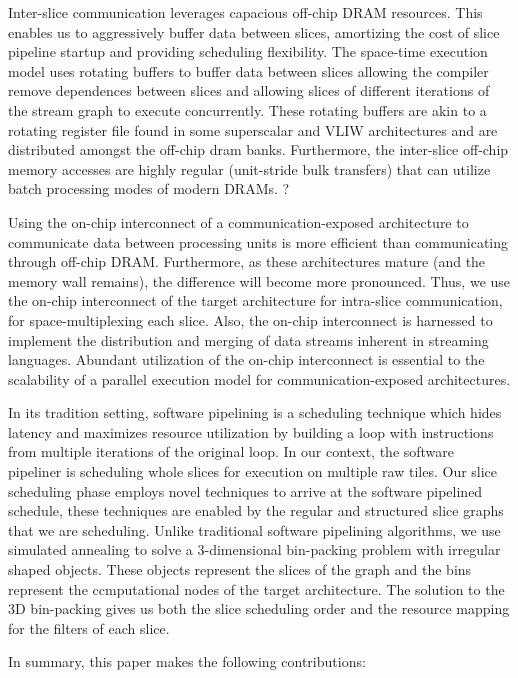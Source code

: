 Inter-slice communication leverages capacious off-chip DRAM resources.
This enables us to aggressively buffer data between slices, amortizing
the cost of slice pipeline startup and providing scheduling
flexibility. The space-time execution model uses rotating buffers to
buffer data between slices allowing the compiler remove dependences
between slices and allowing slices of different iterations of the
stream graph to execute concurrently.  These rotating buffers are akin
to a rotating register file found in some superscalar and VLIW
architectures and are distributed amongst the off-chip dram
banks. Furthermore, the inter-slice off-chip memory accesses are
highly regular (unit-stride bulk transfers) that can utilize batch
processing modes of modern DRAMs. ?

Using the on-chip interconnect of a communication-exposed architecture
to communicate data between processing units is more efficient than
communicating through off-chip DRAM. Furthermore, as these
architectures mature (and the memory wall remains), the difference
will become more pronounced.  Thus, we use the on-chip interconnect of
the target architecture for intra-slice communication, for
space-multiplexing each slice.  Also, the on-chip interconnect is
harnessed to implement the distribution and merging of data streams
inherent in streaming languages. Abundant utilization of the on-chip
interconnect is essential to the scalability of a parallel execution
model for communication-exposed architectures.

In its tradition setting, software pipelining \cite{lam-softpipe,
rau-softpipe} is a scheduling technique which hides latency and
maximizes resource utilization by building a loop with instructions
from multiple iterations of the original loop.  In our context, the
software pipeliner is scheduling whole slices for execution on
multiple raw tiles. Our slice scheduling phase employs novel
techniques to arrive at the software pipelined schedule, these
techniques are enabled by the regular and structured slice graphs that
we are scheduling. Unlike traditional software pipelining algorithms,
we use simulated annealing to solve a 3-dimensional bin-packing
problem with irregular shaped objects.  These objects represent the
slices of the graph and the bins represent the ccmputational nodes of the
target architecture.  The solution to the 3D bin-packing gives us both
the slice scheduling order and the resource mapping for the filters of
each slice.

In summary, this paper makes the following contributions:

